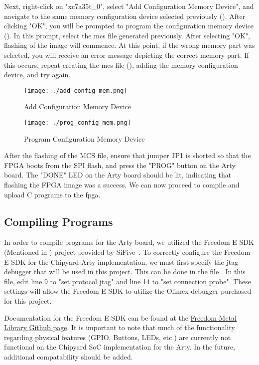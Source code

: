 Next, right-click on "xc7a35t\_0", select "Add Configuration Memory Device", and navigate to the same memory configuration device selected previously ().
After clicking "OK", you will be prompted to program the configuration memory device ().
In this prompt, select the \Gls{mcs} file generated previously.
After selecting "OK", flashing of the image will commence.
At this point, if the wrong memory part was selected, you will receive an error message depicting the correct memory part.
If this occurs, repeat creating the \Gls{mcs} file (), adding the memory configuration device, and try again.

\begin{figure}[h!tbp]
  \centering
  \texttt{[image: ./add\_config\_mem.png]}
  \caption{Add Configuration Memory Device}
  \label{fig:add_config_mem}
\end{figure}

\begin{figure}[h!tbp]
  \centering
  \texttt{[image: ./prog\_config\_mem.png]}
  \caption{Program Configuration Memory Device}
  \label{fig:prog_config_mem}
\end{figure}

After the flashing of the MCS file, ensure that jumper JP1 is shorted so that the FPGA boots from the SPI flash, and press the "PROG" button on the Arty board.
The "DONE" LED on the Arty board should be lit, indicating that flashing the FPGA image was a success.
We can now proceed to compile and upload C programs to the \Gls{fpga}.

\subsection{Compiling Programs}\label{sec:Compiling_Programs}
In order to compile programs for the Arty board, we utilized the Freedom E SDK (Mentioned in ) project provided by SiFive~\cite{freedomESDK}.
To correctly configure the Freedom E SDK for the Chipyard Arty implementation, we must first specify the \Gls{jtag} debugger that will be used in this project.
This can be done in the file .
In this file, edit line 9 to "set protocol jtag" and line 14 to "set connection probe".
These settings will allow the Freedom E SDK to utilize the Olimex debugger purchased for this project.

Documentation for the Freedom E SDK can be found at the \href{https://sifive.github.io/freedom-metal-docs/}{Freedom Metal Library Github page}.
It is important to note that much of the functionality regarding physical features (GPIO, Buttons, LEDs, etc.) are currently not functional on the Chipyard SoC implementation for the Arty.
In the future, additional compatability should be added.

